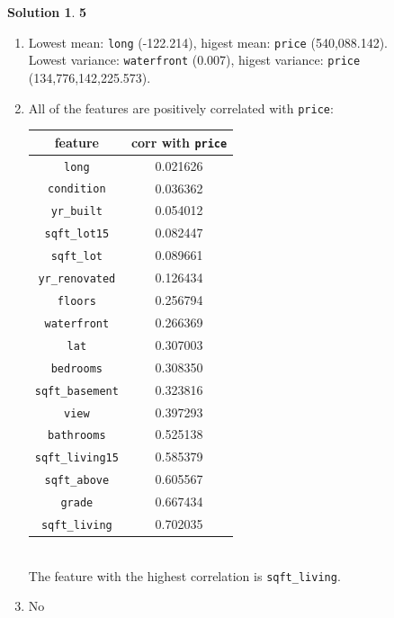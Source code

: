 \documentclass[11pt]{article}
\theoremstyle{definition}
\theoremstyle{nopunct}
\newtheorem*{s}{Solution}
\begin{document}
\begin{s}\textbf{5}
    \begin{enumerate} 
        \item Lowest mean: \texttt{long} (-122.214), higest mean: \texttt{price} (540,088.142). \\
            Lowest variance: \texttt{waterfront} (0.007), higest variance: \texttt{price} (134,776,142,225.573).

        \item All of the features are positively correlated
            with \texttt{price}: \bigskip \\
            \begin{tabular}{c c}
                feature & corr with \texttt{price} \\
                \hline
                \texttt{long}             & 0.021626 \\
                \texttt{condition}        & 0.036362 \\
                \texttt{yr\_built}         & 0.054012 \\
                \texttt{sqft\_lot15}       & 0.082447 \\
                \texttt{sqft\_lot}         & 0.089661 \\
                \texttt{yr\_renovated}     & 0.126434 \\
                \texttt{floors}           & 0.256794 \\
                \texttt{waterfront}       & 0.266369 \\
                \texttt{lat}              & 0.307003 \\
                \texttt{bedrooms}         & 0.308350 \\
                \texttt{sqft\_basement}    & 0.323816 \\
                \texttt{view}             & 0.397293 \\
                \texttt{bathrooms}        & 0.525138 \\
                \texttt{sqft\_living15}    & 0.585379 \\
                \texttt{sqft\_above}       & 0.605567 \\
                \texttt{grade}            & 0.667434 \\
                \texttt{sqft\_living}      & 0.702035
            \end{tabular} \bigskip \\
            The feature with the highest correlation is \texttt{sqft\_living}.

        \item No

    \end{enumerate}
\end{s}
\end{document}

